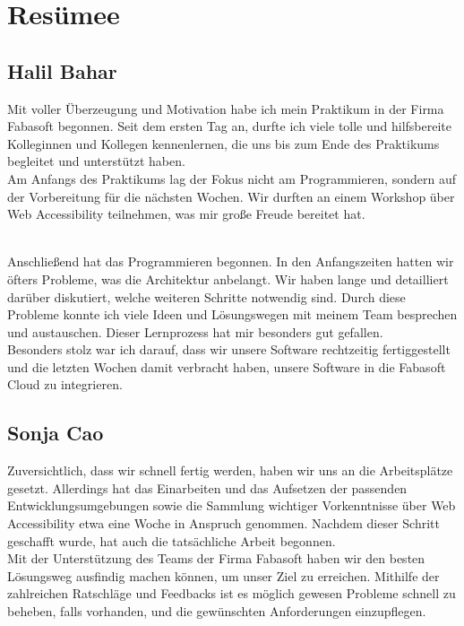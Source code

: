 \chapter{Resümee}
\section{Halil Bahar}
Mit voller Überzeugung und Motivation habe ich mein Praktikum in der Firma Fabasoft begonnen. Seit dem ersten Tag an, durfte ich viele tolle und hilfsbereite Kolleginnen und Kollegen kennenlernen, die uns bis zum Ende des Praktikums begleitet und unterstützt haben.\\
Am Anfangs des Praktikums lag der Fokus nicht am Programmieren, sondern auf der Vorbereitung für die nächsten Wochen. Wir durften an einem Workshop über Web Accessibility teilnehmen, was mir große Freude bereitet hat.

\mbox{}\\
Anschließend hat das Programmieren begonnen. In den Anfangszeiten hatten wir öfters Probleme, was die Architektur anbelangt. Wir haben lange und detailliert darüber diskutiert, welche weiteren Schritte notwendig sind. Durch diese Probleme konnte ich viele Ideen und Lösungswegen mit meinem Team besprechen und austauschen. Dieser Lernprozess hat mir besonders gut gefallen.\\
Besonders stolz war ich darauf, dass wir unsere Software rechtzeitig fertiggestellt und die letzten Wochen damit verbracht haben, unsere Software in die Fabasoft Cloud zu integrieren.


\section{Sonja Cao}
Zuversichtlich, dass wir schnell fertig werden, haben wir uns an die Arbeitsplätze gesetzt. Allerdings hat das Einarbeiten und das Aufsetzen der passenden Entwicklungsumgebungen sowie die Sammlung wichtiger Vorkenntnisse über Web Accessibility etwa eine Woche in Anspruch genommen. Nachdem dieser Schritt geschafft wurde, hat auch die tatsächliche Arbeit begonnen. \\
Mit der Unterstützung des Teams der Firma Fabasoft haben wir den besten Lösungsweg ausfindig machen können, um unser Ziel zu erreichen. Mithilfe der zahlreichen Ratschläge und Feedbacks ist es möglich gewesen Probleme schnell zu beheben, falls vorhanden, und die gewünschten Anforderungen einzupflegen. 

